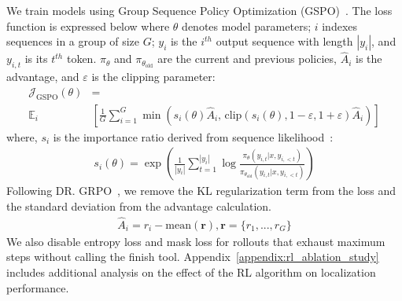 We train \methodname models using Group Sequence Policy Optimization (GSPO)~\citep{zheng2025groupsequencepolicyoptimization}. The loss function is expressed below where $\theta$ denotes model parameters; $i$ indexes sequences in a group of size $G$; $y_i$ is the $i^{th}$ output sequence with length $|y_i|$, and $y_{i,t}$ is its $t^{th}$ token. $\pi_\theta$ and $\pi_{\theta_{\text{old}}}$ are the current and previous policies, $\hat{A}_i$ is the advantage, and $\varepsilon$ is the clipping parameter:
{
\small %
\begin{align}
    \mathcal{J}_{\text{GSPO}}(\theta) &= \nonumber \\ 
    \mathbb{E}_i &\left[ \frac{1}{G} \sum_{i=1}^{G} \min\left( s_i(\theta) \hat{A}_i,\, \text{clip}\left( s_i(\theta), 1-\varepsilon, 1+\varepsilon \right) \hat{A}_i \right) \right]
    \label{eq:gspo}
\end{align}
}
where,  $s_i$ is the importance ratio derived from sequence likelihood~\cite{zheng-etal-2023-click}:
\begin{align}
    s_i(\theta) = \exp\left( \frac{1}{|y_i|} \sum_{t=1}^{|y_i|} \log \frac{\pi_\theta(y_{i,t} | x, y_{i,<t})}{\pi_{\theta_{\text{old}}}(y_{i,t} | x, y_{i,<t})} \right)
    \label{eq:is}
\end{align}
Following DR. GRPO~\cite{liu2025understandingr1zeroliketrainingcritical}, we remove the KL regularization term from the loss and the standard deviation from the advantage calculation.
\begin{align}
    \hat{A}_i = r_i - \text{mean}(\mathbf{r}), \mathbf{r} = \{r_1, ..., r_G\}
\end{align}
We also disable entropy loss and mask loss for rollouts that exhaust maximum steps without calling the finish tool. Appendix~\ref{appendix:rl_ablation_study} includes additional analysis on the effect of the RL algorithm on localization performance.